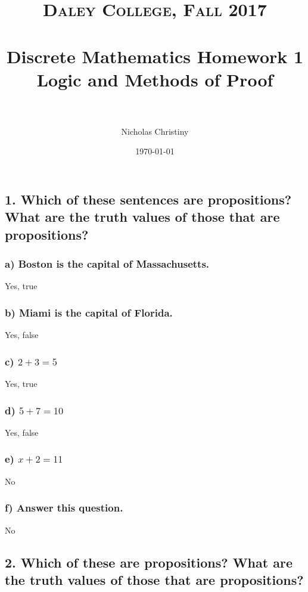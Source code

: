 \documentclass[11pt, oneside]{article} %
\title{	
\normalfont \normalsize 
\textsc{Daley College, Fall 2017} \\ [25pt] %
\horrule{0.5pt} \\[0.4cm] %
\huge Discrete Mathematics Homework 1 \\
\huge Logic and Methods of Proof \\ %
\horrule{2pt} \\[0.5cm] %
}
\author{Nicholas Christiny} %
\date{\normalsize\today} %
\numberwithin{equation}{section} %
\numberwithin{figure}{section} %
\numberwithin{table}{section} %
\begin{document}
\maketitle %

\section{}
\subsection{1. Which of these sentences are propositions? What are the truth values of those that are propositions?}
\subsubsection{a) Boston is the capital of Massachusetts.}
Yes, true
\subsubsection{b) Miami is the capital of Florida.}
Yes, false
\subsubsection{c) $2 + 3 = 5$}
Yes, true
\subsubsection{d) $5 + 7 = 10$}
Yes, false
\subsubsection{e) $x + 2 = 11$}
No
\subsubsection{f) Answer this question.}
No

\subsection{2. Which of these are propositions? What are the truth values of those that are propositions?}
\end{document}
